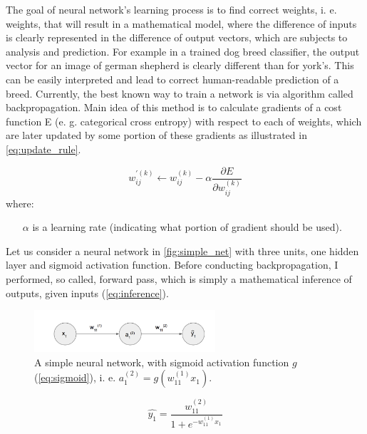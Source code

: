 \documentclass[11pt]{article}
\begin{document}
The goal of neural network's learning process is to find correct weights, i. e. weights, that will result in a mathematical model, where the difference of inputs is clearly represented in the difference of output vectors, which are subjects to analysis and prediction. For example in a trained dog breed classifier, the output vector for an image of german shepherd is clearly different than for york's. This can be easily interpreted and lead to correct human-readable prediction of a breed. Currently, the best known way to train a network is via algorithm called backpropagation. Main idea of this method is to calculate gradients of a cost function E (e. g. categorical cross entropy) with respect to each of weights, which are later updated by some portion of these gradients as illustrated in \autoref{eq:update_rule}.

\begin{equation} \label{eq:update_rule}
w_{ij}^{'(k)} \leftarrow w_{ij}^{(k)} - \alpha\frac{\partial E}{\partial w_{ij}^{(k)}}
\end{equation}
where:
\begin{itemize}
\item[$\alpha$] is a learning rate (indicating what portion of gradient should be used).
\end{itemize}

Let us consider a neural network in \autoref{fig:simple_net} with three units, one hidden layer and sigmoid activation function. Before conducting backpropagation, I performed, so called, forward pass, which is simply a mathematical inference of outputs, given inputs (\autoref{eq:inference}).\\

\begin{figure}[h]
\includegraphics[width=0.6\textwidth]{simple_net}
\centering
\caption{A simple neural network, with sigmoid activation function $g$ (\autoref{eq:sigmoid}), i. e. $a_1^{(2)}=g(w_{11}^{(1)}x_1)$.}
\label{fig:simple_net}
\end{figure}

\begin{equation} \label{eq:inference}
\hat{y_1} = \frac{w_{11}^{(2)}}{1 + e^{-w_{11}^{(1)}x_1}}
\end{equation}
\end{document}
